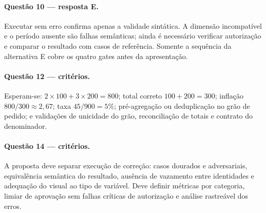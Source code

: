 \paragraph{Questão 10 --- resposta E.} Executar sem erro confirma apenas a validade sintática. A dimensão incompatível e o período ausente são falhas semânticas; ainda é necessário verificar autorização e comparar o resultado com casos de referência. Somente a sequência da alternativa E cobre os quatro gates antes da apresentação.

\paragraph{Questão 12 --- critérios.} Esperam-se: $2\times100+3\times200=800$; total correto $100+200=300$; inflação $800/300\approx2{,}67$; taxa $45/900=5\%$; pré-agregação ou deduplicação no grão de pedido; e validações de unicidade do grão, reconciliação de totais e contrato do denominador.

\paragraph{Questão 14 --- critérios.} A proposta deve separar execução de correção: casos dourados e adversariais, equivalência semântica do resultado, ausência de vazamento entre identidades e adequação do visual ao tipo de variável. Deve definir métricas por categoria, limiar de aprovação sem falhas críticas de autorização e análise rastreável dos erros.

